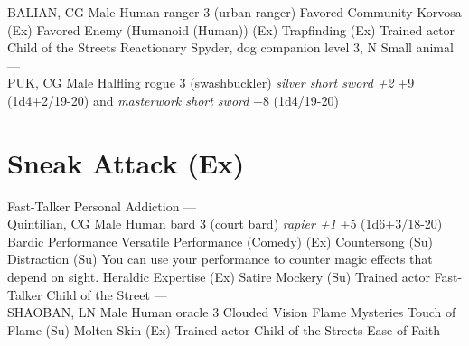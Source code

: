 BALIAN, CG Male Human ranger 3 (urban ranger)                 Favored Community Korvosa (Ex)  Favored Enemy (Humanoid (Human)) (Ex)  Trapfinding (Ex) Trained actor  Child of the Streets  Reactionary Spyder, dog companion level 3, N Small animal           ---\\

PUK, CG Male Halfling rogue 3 (swashbuckler)        {\itshape silver short sword +2} +9 (1d4+2/19-20) and  {\itshape masterwork short sword} +8 (1d4/19-20)         \section{Sneak Attack (Ex)}

Fast-Talker  Personal Addiction ---\\

Quintilian, CG Male Human bard 3 (court bard)        {\itshape rapier +1} +5 (1d6+3/18-20)             Bardic Performance  Versatile Performance (Comedy) (Ex)  Countersong (Su)  Distraction (Su) You can use your performance to counter magic effects that depend on sight.  Heraldic Expertise (Ex)  Satire  Mockery (Su) Trained actor  Fast-Talker  Child of the Street ---\\

SHAOBAN, LN Male Human oracle 3               Clouded Vision  Flame Mysteries  Touch of Flame (Su)   Molten Skin (Ex) Trained actor  Child of the Streets  Ease of Faith 